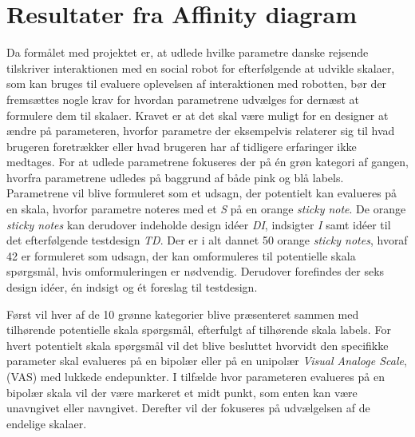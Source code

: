 \section{Resultater fra Affinity diagram}
\label{ParametreDatabehandlingAffinityDiagram}
%
%
Da formålet med projektet er, at udlede hvilke parametre danske rejsende tilskriver interaktionen med en social robot for efterfølgende at udvikle skalaer, som kan bruges til evaluere oplevelsen af interaktionen med robotten, bør der fremsættes nogle krav for hvordan parametrene udvælges for dernæst at formulere dem til skalaer. Kravet er at det skal være muligt for en designer at ændre på parameteren, hvorfor parametre der eksempelvis relaterer sig til hvad brugeren foretrækker eller hvad brugeren har af tidligere erfaringer ikke medtages. \blankline
%
For at udlede parametrene fokuseres der på én grøn kategori af gangen, hvorfra parametrene udledes på baggrund af både pink og blå labels. Parametrene vil blive formuleret som et udsagn, der potentielt kan evalueres på en skala, hvorfor parametre noteres med et \textit{S} på en orange \textit{sticky note}. De orange \textit{sticky notes} kan derudover indeholde design idéer \textit{DI}, indsigter \textit{I} samt idéer til det efterfølgende testdesign \textit{TD}. Der er i alt dannet 50 orange \textit{sticky notes}, hvoraf 42 er formuleret som udsagn, der kan omformuleres til potentielle skala spørgsmål, hvis omformuleringen er nødvendig. Derudover forefindes der seks design idéer, én indsigt og ét foreslag til testdesign.

Først vil hver af de 10 grønne kategorier blive præsenteret sammen med tilhørende potentielle skala spørgsmål, efterfulgt af tilhørende skala labels. For hvert potentielt skala spørgsmål vil det blive besluttet hvorvidt den specifikke parameter skal evalueres på en bipolær eller på en unipolær \textit{Visual Analoge Scale}, (VAS) med lukkede endepunkter. I tilfælde hvor parameteren evalueres på en bipolær skala vil der være markeret et midt punkt, som enten kan være unavngivet eller navngivet. Derefter vil der fokuseres på udvælgelsen af de endelige skalaer.
\newpage 
%
